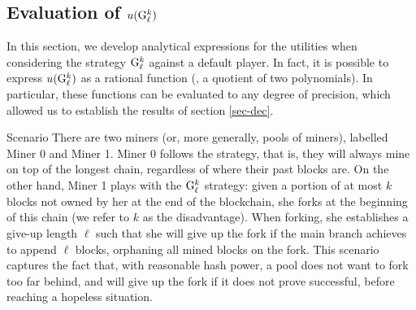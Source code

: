 
\subsection{Evaluation of $u({\rm {G}}^k_\ell)$}
\label{sec-evaluation-G}
In this section, we develop analytical expressions for the utilities when considering the strategy ${\rm {G}}^k_\ell$ against a default player. In fact, it is possible to express $u({\rm {G}}^k_\ell)$ as a rational function (\ie, a quotient of two polynomials). In particular, these functions can be evaluated to any degree of precision, which allowed us to establish the results of section \ref{sec-dec}.

\begin{subsubsection}{Scenario}
There are two miners (or, more generally, pools of miners), labelled Miner 0 and Miner 1. Miner 0 follows the \cdf{} strategy, that is, they will always mine on top of the longest chain, regardless of where their past blocks are. On the other hand, Miner 1 plays with the ${\rm {G}}^k_\ell$ strategy: given a portion of at most $k$ blocks not owned by her at the end of the blockchain, she forks at the beginning of this chain (we refer to $k$ as the disadvantage). When forking, she establishes a give-up length $\ell$ such that she will give up the fork if the main branch achieves to append $\ell$ blocks, orphaning all mined blocks on the fork. This scenario captures the fact that, with reasonable hash power, a pool does not want to fork too far behind, and will give up the fork if it does not prove successful, before reaching a hopeless situation.
\end{subsubsection}



